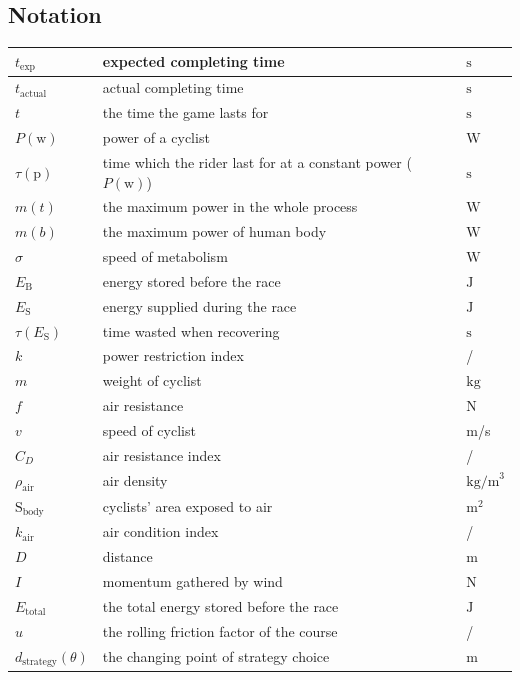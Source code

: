 \documentclass{article}
\begin{document}
		\subsection{Notation}
			\begin{tabular}{|l|l|l|}
				\hline
				$t_\mathrm{exp}$&expected completing time&$\mathrm{s}$\\
				\hline
				$t_\mathrm{actual}$&actual completing time&$\mathrm{s}$\\
				\hline
				$t$&the time the game lasts for&$\mathrm{s}$\\
				\hline
				$P (\mathrm{w})$&power of a cyclist&W\\
				\hline
				$\tau(\mathrm{p})$&time which the rider last for at a constant power ($P (\mathrm{w})$)&$\mathrm{s}$\\
				\hline
				$m(t)$&the maximum power in the whole process&$\mathrm{W}$\\
				\hline
				$m( b )$&the maximum power of human body&$\mathrm{W}$\\
				\hline
				$\sigma$&speed of metabolism&$\mathrm{W}$\\
				\hline
				$ E _\mathrm{B}$&energy stored before the race&$\mathrm{J}$\\
				\hline
				$ E _\mathrm{S}$&energy supplied during the race&$\mathrm{J}$\\
				\hline
				$\tau( E _\mathrm{S})$&time wasted when recovering&$\mathrm{s}$\\
				\hline
				$ k $&power restriction index&/\\
				\hline
				$m$&weight of cyclist&$\mathrm{kg}$\\
				\hline
				$f$&air resistance&$\mathrm{N}$\\
				\hline
				$v$&speed of cyclist&m/s\\
				\hline
				$ C _ D $&air resistance index&/\\
				\hline
				$\rho_\mathrm{air}$&air density&\(\mathrm{kg/m}^3\)\\
				\hline
				$\mathrm{S}_\mathrm{body}$&cyclists' area exposed to air&$\mathrm{m}^2$\\
				\hline
				$ k _\mathrm{air}$&air condition index&/\\
				\hline
				$D$&distance&m\\
				\hline
				$I$&momentum gathered by wind&$\mathrm{N}$\\
				\hline
				$ E _\mathrm{total}$&the total energy stored before the race&$\mathrm{J}$\\
				\hline
				\(u\) & the rolling friction factor of the course & / \\
				\hline
				\(d_{\mathrm{strategy}}\left(\theta\right)\) & the changing point of strategy choice & \(\mathrm{m}\) \\
				\hline
			\end{tabular}
\end{document}
